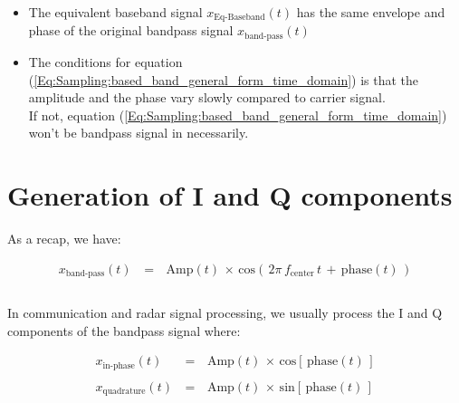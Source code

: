\begin{enumerate}
\begin{itemize}
	\item The equivalent baseband signal $x_{\text{Eq-Baseband}}(t)$ has the same envelope and phase of the original bandpass signal $x_{\text{band-pass}}(t)$ 	
	
	\item The conditions for equation (\ref{Eq:Sampling:based_band_general_form_time_domain}) is that the amplitude and the phase vary slowly compared to carrier signal. \\
	
	If not, equation (\ref{Eq:Sampling:based_band_general_form_time_domain}) won't be bandpass signal in necessarily.
	\end{itemize}

\end{enumerate}

\section{Generation of I and Q components}




As a recap, we have:

\begin{equation}
\begin{array}{rcl}
x_{\text{band-pass}}(t) \, &=&\, \text{Amp}(t) \, \times \, \text{cos}\left(\, 2 \pi \, f_{\text{center}} \, t \, + \, \text{phase}(t) \,\right)\\ \\
\end{array}
\label{Eq:Sampling:based_band_general_form_time_domain_recap}
\end{equation}


In communication and radar signal processing, we usually process the I and Q components of the bandpass signal where:

\begin{equation}
\begin{array}{rcl}
x_{\text{in-phase}}(t) \, &=& \, \text{Amp}(t) \, \times \, \text{cos}\left[\, \text{phase}(t) \, \right] \\ \\
x_{\text{quadrature}}(t) \, &=& \, \text{Amp}(t) \, \times \, \text{sin}\left[\, \text{phase}(t) \, \right] \\ \\
\end{array}
\label{Eq:Sampling:inpahse_quadrature_signals}
\end{equation}

